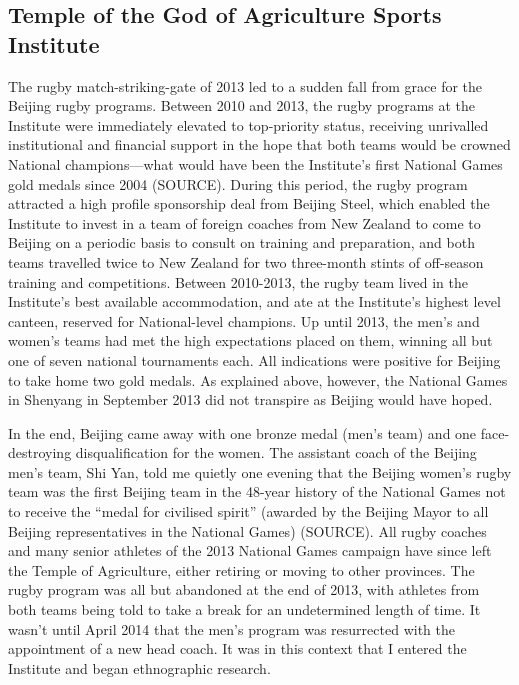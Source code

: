 {\subsection{Temple of the God of Agriculture Sports Institute}
The rugby match-striking-gate of 2013 led to a sudden fall from grace for the Beijing rugby programs.  Between 2010 and 2013, the rugby programs at the Institute were immediately elevated to top-priority status, receiving unrivalled institutional and financial support in the hope that both teams would be crowned National champions---what would have been the Institute's first National Games gold medals since 2004 (SOURCE).  During this period, the rugby program attracted a high profile sponsorship deal from Beijing Steel, which enabled the Institute to invest in a team of foreign coaches from New Zealand to come to Beijing on a periodic basis to consult on training and preparation, and both teams travelled twice to New Zealand for two three-month stints of off-season training and competitions.  Between 2010-2013, the rugby team lived in the Institute's best available accommodation, and ate at the Institute's highest level canteen, reserved for National-level champions.  Up until 2013, the men's and women's teams had met the high expectations placed on them, winning all but one of seven national tournaments each. All indications were positive for Beijing to take home two gold medals. As explained above, however, the National Games in Shenyang in September 2013 did not transpire as Beijing would have hoped.

In the end, Beijing came away with one bronze medal (men's team) and one face-destroying disqualification for the women.  The assistant coach of the Beijing men's team, Shi Yan, told me quietly one evening that the Beijing women's rugby team was the first Beijing team in the 48-year history of the National Games not to receive the ``medal for civilised spirit''  (awarded by the Beijing Mayor to all Beijing representatives in the National Games) (SOURCE).  All rugby coaches and many senior athletes of the 2013 National Games campaign have since left the Temple of Agriculture, either retiring or moving to other provinces.  The rugby program was all but abandoned at the end of 2013, with athletes from both teams being told to take a break for an undetermined length of time.  It wasn't until April 2014 that the men's program was resurrected with the appointment of a new head coach.  It was in this context that I entered the Institute and began ethnographic research.


}
